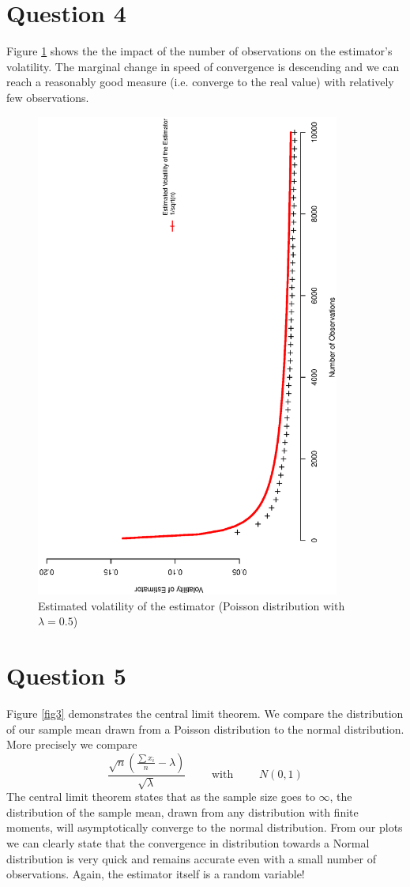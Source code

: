 \section{Question 4}
Figure \ref{fig2} shows the the impact of the number of observations on the estimator's volatility. The marginal change in speed of convergence is descending and we can reach a reasonably good measure (i.e. converge to the real value) with relatively few observations.
\begin{figure}[H]
\centering
\includegraphics[width=10cm, angle=270]{Q1_4plot.eps}
\caption{Estimated volatility of the estimator (Poisson distribution with $\lambda=0.5$)}
\label{fig2}
\end{figure}

\section{Question 5}
Figure \ref{fig3} demonstrates the central limit theorem. We compare the distribution of our sample mean drawn from a Poisson distribution to the normal distribution. More precisely we compare
\begin{equation*}
\frac{\sqrt{n}(\frac{\sum{x_i}}{n}-\lambda)}{\sqrt{\lambda}} \qquad \textrm{ with } \qquad N(0,1)
\end{equation*}
The central limit theorem states that as the sample size goes to $\infty$, the distribution of the sample mean, drawn from any distribution with finite moments, will asymptotically converge to the normal distribution. From our plots we can clearly state that the convergence in distribution towards a Normal distribution is very quick and remains accurate even with a small number of observations. Again, the estimator itself is a random variable!

